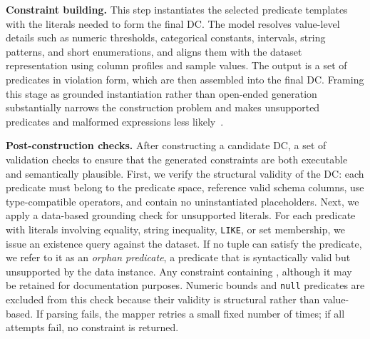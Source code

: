 \smallskip\noindent\textbf{Constraint building.}
This step instantiates the selected predicate templates with the literals needed to form the final DC. The model resolves value-level details such as numeric thresholds, categorical constants, intervals, string patterns, and short enumerations, and aligns them with the dataset representation using column profiles and sample values. The output is a set of predicates in violation form, which are then assembled into the final DC. Framing this stage as grounded instantiation rather than open-ended generation substantially narrows the construction problem and makes unsupported predicates and malformed expressions less likely~\cite{pourreza2023din,picard2021,lin-etal-2020-bridging}.


\smallskip\noindent\textbf{Post-construction checks.}
After constructing a candidate DC,  a set of validation checks to ensure that the generated constraints are both executable and semantically plausible. First, we verify the structural validity of the DC: each predicate must belong to the predicate space, reference valid schema columns, use type-compatible operators, and contain no uninstantiated placeholders. Next, we apply a data-based grounding check for unsupported literals. For each predicate with literals involving equality, string inequality, \texttt{LIKE}, or set membership, we issue an existence query against the dataset. If no tuple can satisfy the predicate, we refer to it as an \emph{orphan predicate},  a predicate that is syntactically valid but unsupported by the data instance. Any constraint containing , although it may be retained for documentation purposes.  
Numeric bounds and \texttt{null} predicates are excluded from this check because their validity is structural rather than value-based.
If parsing fails, the mapper retries a small fixed number of times; if all attempts fail, no constraint is returned.

